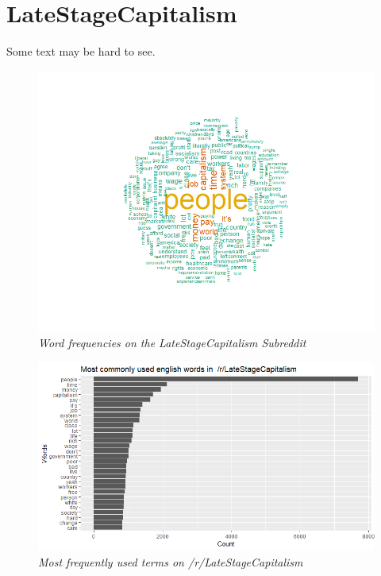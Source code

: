 \section{LateStageCapitalism}
\label{sec:lsc}
Some text may be hard to see.
\begin{figure}[ht]
    \centering
    \includegraphics[width=1.0\textwidth]{graphs/LateStageCapitalism/WordCloud_LateStageCapitalism.png}
    \caption{\textit{Word frequencies on the LateStageCapitalism Subreddit}}
    \label{fig:lsc_cloud}
\end{figure}

\begin{figure}[H]
    \centering
    \includegraphics[width=1.0\textwidth]{graphs/LateStageCapitalism/WordFreq_LateStageCapitalism.png}
    \caption{\textit{Most frequently used terms on /r/LateStageCapitalism}}
    \label{fig:lsc_wordfreq}
\end{figure}

